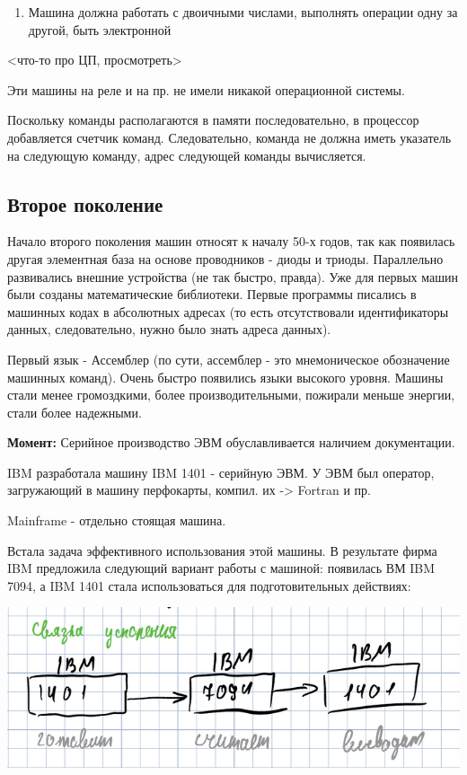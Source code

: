 \documentclass[14pt, a4paper]{article}
\begin{document}
{\begin{enumerate}
		\item Машина должна работать с двоичными числами, выполнять операции одну за другой, быть электронной
	
	\end{enumerate}
	
	<что-то про ЦП, просмотреть>
	
	Эти машины на реле и на пр. не имели никакой операционной системы.
	
	Поскольку команды располагаются в памяти последовательно, в процессор добавляется счетчик команд.
	Следовательно, команда не должна иметь указатель на следующую команду, адрес следующей команды вычисляется.
	
	\subsection*{Второе поколение}
	
	Начало второго поколения машин относят к началу 50-х годов, так как появилась другая элементная база
	на основе проводников - диоды и триоды. Параллельно развивались внешние устройства (не так быстро, правда).
	Уже для первых машин были созданы математические библиотеки. Первые программы писались в машинных кодах
	в абсолютных адресах (то есть отсутствовали идентификаторы данных, следовательно, нужно было знать адреса данных).
	
	Первый язык - Ассемблер (по сути, ассемблер - это мнемоническое обозначение машинных команд).
	Очень быстро появились языки высокого уровня. Машины стали менее громоздкими, более производительными,
	пожирали меньше энергии, стали более надежными.
	
	{\bf Момент:} Серийное производство ЭВМ обуславливается наличием документации.
	
	IBM разработала машину IBM 1401 - серийную ЭВМ. У ЭВМ был оператор, загружающий в машину перфокарты, компил. их -> Fortran и пр.
	
	Mainframe - отдельно стоящая машина.
	
	Встала задача эффективного использования этой машины. В результате фирма IBM предложила следующий
	вариант работы с машиной: появилась ВМ IBM 7094, а IBM 1401 стала использоваться для подготовительных действиях:
	
	\includegraphics[width=\linewidth]{ibm7094}
	
}
\end{document}
